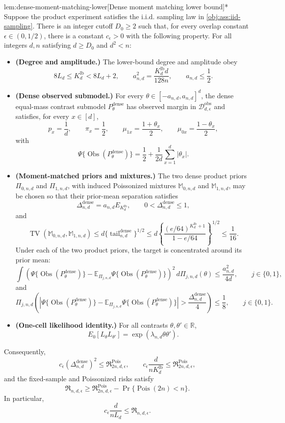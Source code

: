 \begin{lemmav}{lem:dense-moment-matching-lower}[Dense moment matching lower bound]*
Suppose the product experiment satisfies the i.i.d. sampling law in \cref{obj:ass:iid-sampling}.  There is an integer cutoff \(D_0\geq2\) such that, for every overlap constant \(\epsilon\in(0,1/2)\), there is a constant \(c_\epsilon>0\) with the following property.  For all integers \(d,n\) satisfying \(d\geq D_0\) and \(d^2<n\):
\begin{itemize}
\item \textbf{(Degree and amplitude.)} The lower-bound degree and amplitude obey
\[
8L_d\leq K_d^{\mathrm{lb}}<8L_d+2,
\qquad
a_{n,d}^2=\frac{K_d^{\mathrm{lb}}d}{128n},
\qquad
a_{n,d}\leq \frac12 .
\]
\item \textbf{(Dense observed submodel.)} For every \(\theta\in[-a_{n,d},a_{n,d}]^d\), the dense equal-mass contrast submodel \(P_\theta^{\mathrm{dense}}\) has observed margin in \(\mathcal D_{d,\epsilon}^{\mathrm{obs}}\) and satisfies, for every \(x\in[d]\),
\[
p_x=\frac1d,
\qquad
\pi_x=\frac12,
\qquad
\mu_{1x}=\frac{1+\theta_x}{2},
\qquad
\mu_{0x}=\frac{1-\theta_x}{2},
\]
with
\[
\Psi\{\operatorname{Obs}(P_\theta^{\mathrm{dense}})\}
=
\frac12+\frac{1}{2d}\sum_{x=1}^d|\theta_x|.
\]
\item \textbf{(Moment-matched priors and mixtures.)} The two dense product priors \(\Pi_{0,n,d}\) and \(\Pi_{1,n,d}\), with induced Poissonized mixtures \(\mathbb M_{0,n,d}\) and \(\mathbb M_{1,n,d}\), may be chosen so that their prior-mean separation satisfies
\[
\Delta_{n,d}^{\mathrm{dense}}
=
a_{n,d}E_{K_d^{\mathrm{lb}}},
\qquad
0<\Delta_{n,d}^{\mathrm{dense}}\leq1,
\]
and
\[
\operatorname{TV}(\mathbb M_{0,n,d},\mathbb M_{1,n,d})
\leq
d\{\operatorname{tail}_{n,d}^{\mathrm{dense}}\}^{1/2}
\leq
d\left\{\frac{(e/64)^{K_d^{\mathrm{lb}}+1}}{1-e/64}\right\}^{1/2}
\leq\frac1{16}.
\]
Under each of the two product priors, the target is concentrated around its prior mean:
\[
\int
\left(\Psi\{\operatorname{Obs}(P_\theta^{\mathrm{dense}})\}
-\mathbb E_{\Pi_{j,n,d}}\Psi\{\operatorname{Obs}(P_\theta^{\mathrm{dense}})\}\right)^2
\,d\Pi_{j,n,d}(\theta)
\leq
\frac{a_{n,d}^2}{4d},
\qquad j\in\{0,1\},
\]
and
\[
\Pi_{j,n,d}\left(
\left|\Psi\{\operatorname{Obs}(P_\theta^{\mathrm{dense}})\}
-\mathbb E_{\Pi_{j,n,d}}\Psi\{\operatorname{Obs}(P_\theta^{\mathrm{dense}})\}\right|
>
\frac{\Delta_{n,d}^{\mathrm{dense}}}{4}
\right)
\leq
\frac18,
\qquad j\in\{0,1\}.
\]
\item \textbf{(One-cell likelihood identity.)} For all contrasts \(\theta,\theta'\in\mathbb R\),
\[
E_0[L_\theta L_{\theta'}]
=
\exp(\lambda_{n,d}\theta\theta').
\]
\end{itemize}
Consequently,
\[
c_\epsilon(\Delta_{n,d}^{\mathrm{dense}})^2
\leq
\mathfrak R^{\mathrm{Pois}}_{2n,d,\epsilon},
\qquad
c_\epsilon\frac{d}{nK_d^{\mathrm{lb}}}
\leq
\mathfrak R^{\mathrm{Pois}}_{2n,d,\epsilon},
\]
and the fixed-sample and Poissonized risks satisfy
\[
\mathfrak R_{n,d,\epsilon}
\geq
\mathfrak R^{\mathrm{Pois}}_{2n,d,\epsilon}
-
\Pr\{\operatorname{Pois}(2n)<n\}.
\]
In particular,
\[
c_\epsilon\frac{d}{nL_d}
\leq
\mathfrak R_{n,d,\epsilon}.
\]
\end{lemmav}
